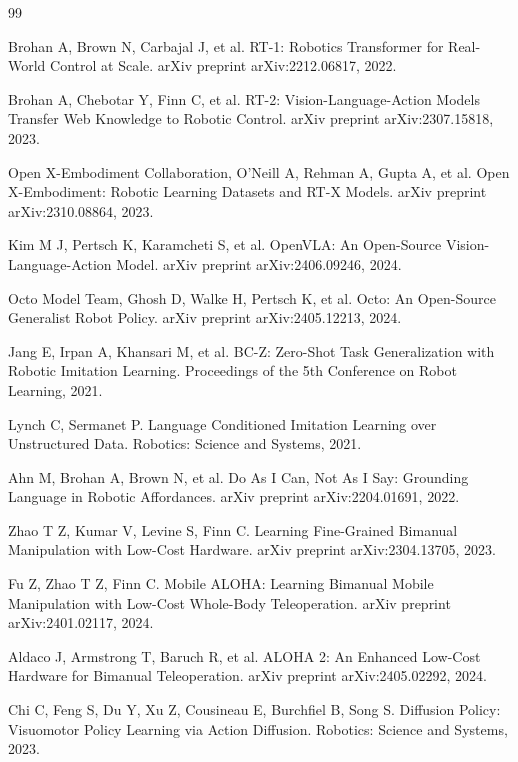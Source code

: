 \documentclass[UTF8,a4paper,zihao=5,scheme=chinese]{ctexart}
\numberwithin{figure}{section}
\numberwithin{table}{section}
\begin{document}
\clearpage
{}
\begin{thebibliography}{99}

Brohan A, Brown N, Carbajal J, et al. RT-1: Robotics Transformer for Real-World Control at Scale. arXiv preprint arXiv:2212.06817, 2022.

Brohan A, Chebotar Y, Finn C, et al. RT-2: Vision-Language-Action Models Transfer Web Knowledge to Robotic Control. arXiv preprint arXiv:2307.15818, 2023.

Open X-Embodiment Collaboration, O'Neill A, Rehman A, Gupta A, et al. Open X-Embodiment: Robotic Learning Datasets and RT-X Models. arXiv preprint arXiv:2310.08864, 2023.

Kim M J, Pertsch K, Karamcheti S, et al. OpenVLA: An Open-Source Vision-Language-Action Model. arXiv preprint arXiv:2406.09246, 2024.

Octo Model Team, Ghosh D, Walke H, Pertsch K, et al. Octo: An Open-Source Generalist Robot Policy. arXiv preprint arXiv:2405.12213, 2024.

Jang E, Irpan A, Khansari M, et al. BC-Z: Zero-Shot Task Generalization with Robotic Imitation Learning. Proceedings of the 5th Conference on Robot Learning, 2021.

Lynch C, Sermanet P. Language Conditioned Imitation Learning over Unstructured Data. Robotics: Science and Systems, 2021.

Ahn M, Brohan A, Brown N, et al. Do As I Can, Not As I Say: Grounding Language in Robotic Affordances. arXiv preprint arXiv:2204.01691, 2022.

Zhao T Z, Kumar V, Levine S, Finn C. Learning Fine-Grained Bimanual Manipulation with Low-Cost Hardware. arXiv preprint arXiv:2304.13705, 2023.

Fu Z, Zhao T Z, Finn C. Mobile ALOHA: Learning Bimanual Mobile Manipulation with Low-Cost Whole-Body Teleoperation. arXiv preprint arXiv:2401.02117, 2024.

Aldaco J, Armstrong T, Baruch R, et al. ALOHA 2: An Enhanced Low-Cost Hardware for Bimanual Teleoperation. arXiv preprint arXiv:2405.02292, 2024.

Chi C, Feng S, Du Y, Xu Z, Cousineau E, Burchfiel B, Song S. Diffusion Policy: Visuomotor Policy Learning via Action Diffusion. Robotics: Science and Systems, 2023.


\end{thebibliography}
\end{document}
